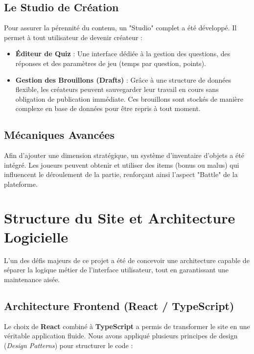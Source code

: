 \documentclass[12pt,a4paper]{article}
\begin{document}
\subsection{Le Studio de Création}
Pour assurer la pérennité du contenu, un "Studio" complet a été développé. Il permet à tout utilisateur de devenir créateur :
\begin{itemize}
    \item \textbf{Éditeur de Quiz} : Une interface dédiée à la gestion des questions, des réponses et des paramètres de jeu (temps par question, points).
    \item \textbf{Gestion des Brouillons (Drafts)} : Grâce à une structure de données flexible, les créateurs peuvent sauvegarder leur travail en cours sans obligation de publication immédiate. Ces brouillons sont stockés de manière complexe en base de données pour être repris à tout moment.
\end{itemize}

\subsection{Mécaniques Avancées}
Afin d'ajouter une dimension stratégique, un système d'inventaire d'objets a été intégré. Les joueurs peuvent obtenir et utiliser des items (bonus ou malus) qui influencent le déroulement de la partie, renforçant ainsi l'aspect "Battle" de la plateforme.


\section{Structure du Site et Architecture Logicielle}

L'un des défis majeurs de ce projet a été de concevoir une architecture capable de séparer la logique métier de l'interface utilisateur, tout en garantissant une maintenance aisée.

\subsection{Architecture Frontend (React / TypeScript)}
Le choix de \textbf{React} combiné à \textbf{TypeScript} a permis de transformer le site en une véritable application fluide. Nous avons appliqué plusieurs principes de design (\textit{Design Patterns}) pour structurer le code :
\end{document}
